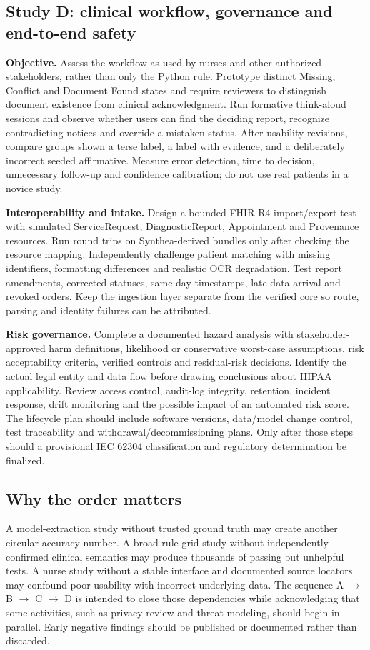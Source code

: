 \documentclass[11pt,twocolumn]{article}
\begin{document}
\subsection{Study D: clinical workflow, governance and end-to-end safety}
\textbf{Objective.} Assess the workflow as used by nurses and other authorized stakeholders, rather than only the Python rule. Prototype distinct Missing, Conflict and Document Found states and require reviewers to distinguish document existence from clinical acknowledgment. Run formative think-aloud sessions and observe whether users can find the deciding report, recognize contradicting notices and override a mistaken status. After usability revisions, compare groups shown a terse label, a label with evidence, and a deliberately incorrect seeded affirmative. Measure error detection, time to decision, unnecessary follow-up and confidence calibration; do not use real patients in a novice study.

\textbf{Interoperability and intake.} Design a bounded FHIR R4 import/export test with simulated ServiceRequest, DiagnosticReport, Appointment and Provenance resources. Run round trips on Synthea-derived bundles only after checking the resource mapping. Independently challenge patient matching with missing identifiers, formatting differences and realistic OCR degradation. Test report amendments, corrected statuses, same-day timestamps, late data arrival and revoked orders. Keep the ingestion layer separate from the verified core so route, parsing and identity failures can be attributed.

\textbf{Risk governance.} Complete a documented hazard analysis with stakeholder-approved harm definitions, likelihood or conservative worst-case assumptions, risk acceptability criteria, verified controls and residual-risk decisions. Identify the actual legal entity and data flow before drawing conclusions about HIPAA applicability. Review access control, audit-log integrity, retention, incident response, drift monitoring and the possible impact of an automated risk score. The lifecycle plan should include software versions, data/model change control, test traceability and withdrawal/decommissioning plans. Only after those steps should a provisional IEC 62304 classification and regulatory determination be finalized.

\subsection{Why the order matters}
A model-extraction study without trusted ground truth may create another circular accuracy number. A broad rule-grid study without independently confirmed clinical semantics may produce thousands of passing but unhelpful tests. A nurse study without a stable interface and documented source locators may confound poor usability with incorrect underlying data. The sequence A $\to$ B $\to$ C $\to$ D is intended to close those dependencies while acknowledging that some activities, such as privacy review and threat modeling, should begin in parallel. Early negative findings should be published or documented rather than discarded.
\end{document}
